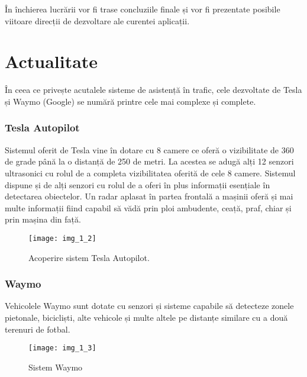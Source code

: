 În închierea lucrării vor fi trase concluziile finale și vor fi prezentate posibile viitoare direcții de dezvoltare ale curentei aplicații.

\section{Actualitate}

În ceea ce privește acutalele sisteme de asistență în trafic, cele dezvoltate de Tesla și Waymo (Google) se numără printre cele mai complexe și complete.

\subsubsection{Tesla Autopilot}

Sistemul oferit de Tesla vine în dotare cu 8 camere ce oferă o vizibilitate de 360 de grade până la o distanță de 250 de metri. La acestea se adugă alți 12 senzori ultrasonici cu rolul de a completa vizibilitatea oferită de cele 8 camere. Sistemul dispune și de alți senzori cu rolul de a oferi în plus informații esențiale în detectarea obiectelor. Un radar aplasat în partea frontală a mașinii oferă și mai multe informații fiind capabil să vădă prin ploi ambudente, ceață, praf, chiar și prin mașina din față.

\begin{figure}[!h]
	\centering
	\texttt{[image: img\_1\_2]}
	\caption{Acoperire sistem Tesla Autopilot.}
\end{figure} 

\subsubsection{Waymo}

Vehicolele Waymo sunt dotate cu senzori și sisteme capabile să detecteze zonele pietonale, bicicliști, alte vehicole și multe altele pe distanțe similare cu a două terenuri de fotbal.

\begin{figure}[!h]
	\centering
	\texttt{[image: img\_1\_3]}
	\caption{Sistem Waymo}
\end{figure} 